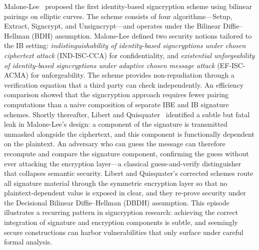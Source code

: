 \documentclass[conference]{IEEEtran}
\begin{document}
Malone-Lee~\cite{malonelee2002} proposed the first identity-based signcryption scheme using bilinear pairings on elliptic curves. The scheme consists of four algorithms---Setup, Extract, Signcrypt, and Unsigncrypt---and operates under the Bilinear Diffie--Hellman (BDH) assumption. Malone-Lee defined two security notions tailored to the IB setting: \textit{indistinguishability of identity-based signcryptions under chosen ciphertext attack} (IND-ISC-CCA) for confidentiality, and \textit{existential unforgeability of identity-based signcryptions under adaptive chosen message attack} (EF-ISC-ACMA) for unforgeability. The scheme provides non-repudiation through a verification equation that a third party can check independently. An efficiency comparison showed that the signcryption approach requires fewer pairing computations than a naive composition of separate IBE and IB signature schemes. Shortly thereafter, Libert and Quisquater~\cite{libert2003} identified a subtle but fatal leak in Malone-Lee's design: a component of the signature is transmitted unmasked alongside the ciphertext, and this component is functionally dependent on the plaintext. An adversary who can guess the message can therefore recompute and compare the signature component, confirming the guess without ever attacking the encryption layer---a classical guess-and-verify distinguisher that collapses semantic security. Libert and Quisquater's corrected schemes route all signature material through the symmetric encryption layer so that no plaintext-dependent value is exposed in clear, and they re-prove security under the Decisional Bilinear Diffie--Hellman (DBDH) assumption. This episode illustrates a recurring pattern in signcryption research: achieving the correct integration of signature and encryption components is subtle, and seemingly secure constructions can harbor vulnerabilities that only surface under careful formal analysis.
\end{document}
